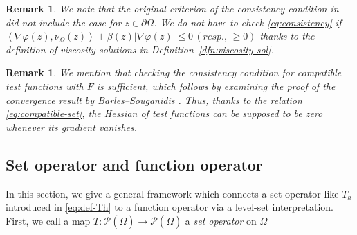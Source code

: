 \documentclass[11pt]{article}
\numberwithin{equation}{section}
\newtheorem{remark}[theorem]{Remark}
\newcommand{\closure}[1]{\overline{#1}}
\newcommand{\fix}[1]{\textcolor{red}{#1}}
\newcommand{\todo}[1]{\textbf{TODO:} \emph{#1}}
\def\le{\leqslant}
\def\ge{\geqslant}
\begin{document}
\begin{remark}
    We note that the original criterion of the consistency condition in \cite[Theorem 2.1]{BS91} did not include the case for $z\in\partial\Omega$.
    We do not have to check \eqref{eq:consistency} if $\left<\nabla\varphi(z),\nu_\Omega(z)\right> + \beta(z)|\nabla\varphi(z)| \le 0\, (resp.,\, \ge 0)$
    thanks to the definition of viscosity solutions in Definition~\ref{dfn:viscosity-sol}.
\end{remark}

\begin{remark}
    We mention that checking the consistency condition for compatible test functions with $F$ is sufficient, which follows by examining the proof of the convergence result by Barles--Souganidis \cite[Theorem 2.1]{BS91}.
    Thus, thanks to the relation \eqref{eq:compatible-set}, the Hessian of test functions can be supposed to be zero whenever its gradient vanishes.
\end{remark}

\subsection{Set operator and function operator}




In this section, we give a general framework which connects a set operator like $T_h$ introduced in \eqref{eq:def-Th} to a function operator via a level-set interpretation.
First, we call a map $T:\mathcal P(\closure{\Omega})\to\mathcal P(\closure{\Omega})$ a \textit{set operator} on $\closure{\Omega}$
\end{document}
